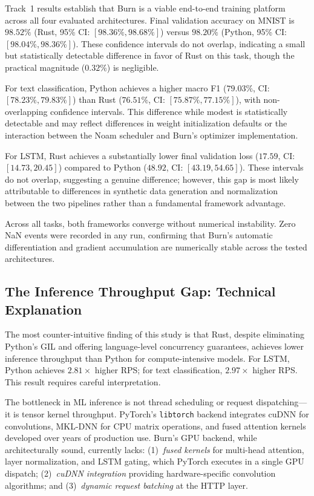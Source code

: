 \documentclass{ieeeaccess}
\begin{document}
Track~1 results establish that Burn is a viable end-to-end training platform across all four evaluated architectures. Final validation accuracy on MNIST is $98.52\%$ (Rust, 95\% CI: $[98.36\%, 98.68\%]$) versus $98.20\%$ (Python, 95\% CI: $[98.04\%, 98.36\%]$). These confidence intervals do not overlap, indicating a small but statistically detectable difference in favor of Rust on this task, though the practical magnitude ($0.32\%$) is negligible.

For text classification, Python achieves a higher macro F1 ($79.03\%$, CI: $[78.23\%, 79.83\%]$) than Rust ($76.51\%$, CI: $[75.87\%, 77.15\%]$), with non-overlapping confidence intervals. This difference while modest is statistically detectable and may reflect differences in weight initialization defaults or the interaction between the Noam scheduler and Burn's optimizer implementation.

For LSTM, Rust achieves a substantially lower final validation loss ($17.59$, CI: $[14.73, 20.45]$) compared to Python ($48.92$, CI: $[43.19, 54.65]$). These intervals do not overlap, suggesting a genuine difference; however, this gap is most likely attributable to differences in synthetic data generation and normalization between the two pipelines rather than a fundamental framework advantage.

Across all tasks, both frameworks converge without numerical instability. Zero NaN events were recorded in any run, confirming that Burn's automatic differentiation and gradient accumulation are numerically stable across the tested architectures.

\subsection{The Inference Throughput Gap: Technical Explanation}

The most counter-intuitive finding of this study is that Rust, despite eliminating Python's GIL and offering language-level concurrency guarantees, achieves lower inference throughput than Python for compute-intensive models. For LSTM, Python achieves $2.81\times$ higher RPS; for text classification, $2.97\times$ higher RPS. This result requires careful interpretation.

The bottleneck in ML inference is not thread scheduling or request dispatching---it is tensor kernel throughput. PyTorch's \texttt{libtorch} backend integrates cuDNN for convolutions, MKL-DNN for CPU matrix operations, and fused attention kernels developed over years of production use. Burn's GPU backend, while architecturally sound, currently lacks: (1)~\emph{fused kernels} for multi-head attention, layer normalization, and LSTM gating, which PyTorch executes in a single GPU dispatch; (2)~\emph{cuDNN integration} providing hardware-specific convolution algorithms; and (3)~\emph{dynamic request batching} at the HTTP layer.
\end{document}
